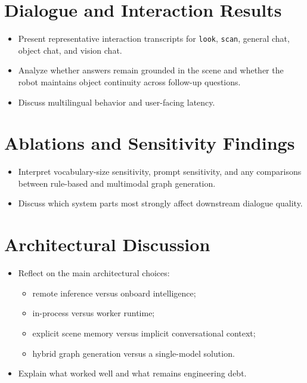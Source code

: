 \documentclass[
  digital,     %
  oneside,     %
  nosansbold,  %
  nocolorbold, %
  lof,         %
  lot,         %
]{fithesis4}
\begin{document}
\section{Dialogue and Interaction Results}
\begin{itemize}
    \item Present representative interaction transcripts for \texttt{look}, \texttt{scan}, general chat, object chat, and vision chat.
    \item Analyze whether answers remain grounded in the scene and whether the robot maintains object continuity across follow-up questions.
    \item Discuss multilingual behavior and user-facing latency.
\end{itemize}

\section{Ablations and Sensitivity Findings}
\begin{itemize}
    \item Interpret vocabulary-size sensitivity, prompt sensitivity, and any comparisons between rule-based and multimodal graph generation.
    \item Discuss which system parts most strongly affect downstream dialogue quality.
\end{itemize}

\section{Architectural Discussion}
\begin{itemize}
    \item Reflect on the main architectural choices:
    \begin{itemize}
        \item remote inference versus onboard intelligence;
        \item in-process versus worker runtime;
        \item explicit scene memory versus implicit conversational context;
        \item hybrid graph generation versus a single-model solution.
    \end{itemize}
    \item Explain what worked well and what remains engineering debt.
\end{itemize}
\end{document}
